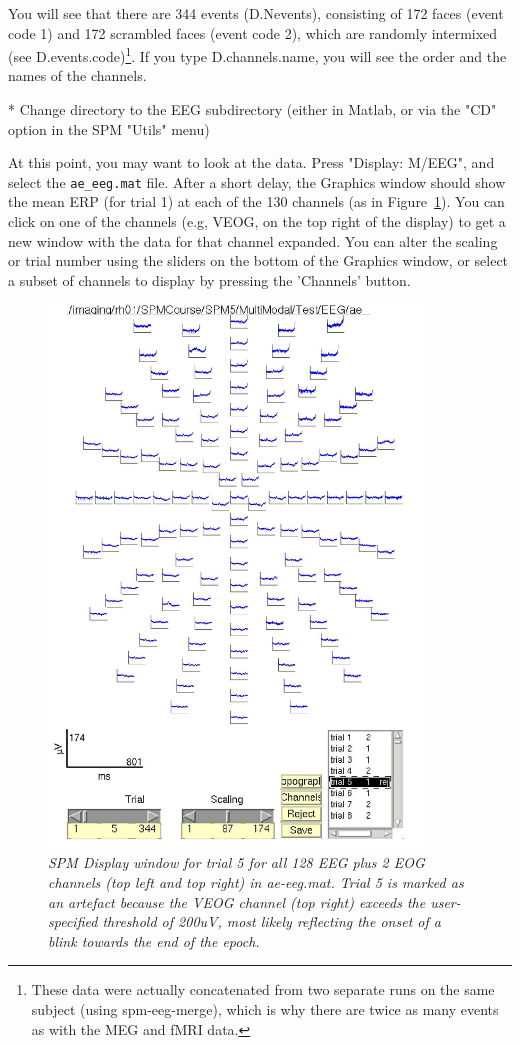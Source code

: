 You will see that there are 344 events (D.Nevents), consisting of 172 faces (event code 1) and 172 scrambled faces (event code 2), which are randomly intermixed (see D.events.code)\footnote{These data were actually concatenated from two separate runs on the same subject (using spm-eeg-merge), which is why there are twice as many events as with the MEG and fMRI data.}. If you type D.channels.name, you will see the order and the names of the channels.


* Change directory to the EEG subdirectory (either in Matlab, or via the "CD" option in the SPM "Utils" menu)



At this point, you may want to look at the data. Press "Display: M/EEG", and select the \verb!ae_eeg.mat! file. After a short delay, the Graphics window should show the mean ERP (for trial 1) at each of the 130 channels (as in Figure~\ref{fig_32_2}). You can click on one of the channels (e.g, VEOG, on the top right of the display) to get a new window with the data for that channel expanded. You can alter the scaling or trial number using the sliders on the bottom of the Graphics window, or select a subset of channels to display by pressing the 'Channels' button.

\begin{figure}
\begin{center}
\includegraphics[width=100mm]{multimodal/figures/figure_32_2}
\caption{\em  SPM Display window for trial 5 for all 128 EEG plus 2 EOG channels (top left and top right) in ae-eeg.mat. Trial 5 is marked as an artefact because the VEOG channel (top right) exceeds the user-specified threshold of 200uV, most likely reflecting the onset of a blink towards the end of the epoch. \label{fig_32_2}}
\end{center}
\end{figure}




